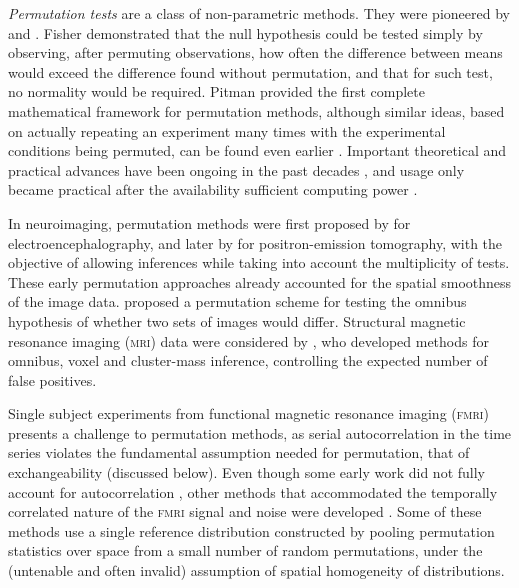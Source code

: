 \emph{Permutation tests} are a class of non-parametric methods. They were pioneered by \citet{Fisher1935} and \citet{Pitman1937-I, Pitman1937-II, Pitman1938}. Fisher demonstrated that the null hypothesis could be tested simply by observing, after permuting observations, how often the difference between means would exceed the difference found without permutation, and that for such test, no normality would be required. Pitman provided the first complete mathematical framework for permutation methods, although similar ideas, based on actually repeating an experiment many times with the experimental conditions being permuted, can be found even earlier \citep{Peirce1884}. Important theoretical and practical advances have been ongoing in the past decades \citep{Pearson1937, Scheffe1943, Lehmann1949, Kempthorne1955, Edgington1995, Good2002, Good2005, Westfall2008, Pesarin2010}, and usage only became practical after the availability sufficient computing power \citep{Efron1979}.

In neuroimaging, permutation methods were first proposed by \citet{Blair1994_thatcher} for electroencephalography, and later by \citet{Holmes1996} for positron-emission tomography, with the objective of allowing inferences while taking into account the multiplicity of tests. These early permutation approaches already accounted for the spatial smoothness of the image data. \citet{Arndt1996} proposed a permutation scheme for testing the omnibus hypothesis of whether two sets of images would differ. Structural magnetic resonance imaging (\textsc{mri}) data were considered by \citet{Bullmore1999}, who developed methods for omnibus, voxel and cluster-mass inference, controlling the expected number of false positives.

Single subject experiments from functional magnetic resonance imaging (\textsc{fmri}) presents a challenge to permutation methods, as serial autocorrelation in the time series violates the fundamental assumption needed for permutation, that of exchangeability (discussed below). Even though some early work did not fully account for autocorrelation \citep{Belmonte2001}, other methods that accommodated the temporally correlated nature of the \textsc{fmri} signal and noise were developed \citep{Bullmore1996, Bullmore2001, Locascio1997, Brammer1997, Breakspear2004, Laird2004}. Some of these methods use a single reference distribution constructed by pooling permutation statistics over space from a small number of random permutations, under the (untenable and often invalid) assumption of spatial homogeneity of distributions.

